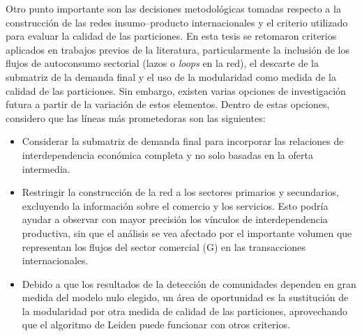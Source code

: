 Otro punto importante son las decisiones metodológicas tomadas respecto a la construcción de las redes insumo--producto internacionales y el criterio utilizado para evaluar la calidad de las particiones. En esta tesis se retomaron criterios aplicados en trabajos previos de la literatura, particularmente la inclusión de los flujos de autoconsumo sectorial (lazos o \textit{loops} en la red), el descarte de la submatriz de la demanda final y el uso de la modularidad como medida de la calidad de las particiones. Sin embargo, existen varias opciones de investigación futura a partir de la variación de estos elementos. Dentro de estas opciones, considero que las líneas más prometedoras son las siguientes:
\begin{itemize}
	\item Considerar la submatriz de demanda final para incorporar las relaciones de interdependencia económica completa y no solo basadas en la oferta intermedia.
	\item Restringir la construcción de la red a los sectores primarios y secundarios, excluyendo la información sobre el comercio y los servicios. Esto podría ayudar a observar con mayor precisión los vínculos de interdependencia productiva, sin que el análisis se vea afectado por el importante volumen que representan los flujos del sector comercial (G) en las transacciones internacionales.
	\item Debido a que los resultados de la detección de comunidades dependen en gran medida del modelo nulo elegido, un área de oportunidad es la sustitución de la modularidad por otra medida de calidad de las particiones, aprovechando que el algoritmo de Leiden puede funcionar con otros criterios.
\end{itemize} 

